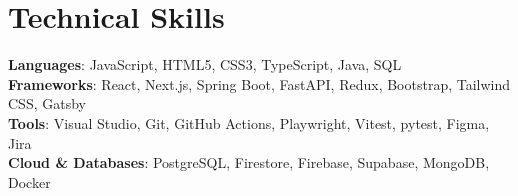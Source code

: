 \documentclass[letterpaper,10pt]{article}
\begin{document}
\section{Technical Skills}
 \begin{itemize}[leftmargin=0.15in, label={}]
    \small{\item{
     \textbf{Languages}{: JavaScript, HTML5, CSS3, TypeScript, Java, SQL} \\
     \textbf{Frameworks}{: React, Next.js, Spring Boot, FastAPI, Redux, Bootstrap, Tailwind CSS, Gatsby} \\
     \textbf{Tools}{: Visual Studio, Git, GitHub Actions, Playwright, Vitest, pytest, Figma, Jira} \\
     \textbf{Cloud \& Databases}{: PostgreSQL, Firestore, Firebase, Supabase, MongoDB, Docker}
    }}
 \end{itemize}


\end{document}
